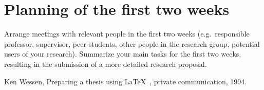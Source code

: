 \documentclass[english]{article}
\begin{document}
\section*{Planning of the first two weeks}
Arrange meetings with relevant people in the first two weeks (e.g.\ responsible professor, supervisor, peer students, other people in the research group, potential users of your research).
Summarize your main tasks for the first two weeks, resulting in the submission of a more detailed research proposal.

%
%

\begin{thebibliography}{9}
 Ken Wessen, Preparing a thesis using \LaTeX~, private
communication, 1994.
\end{thebibliography}
\end{document}
